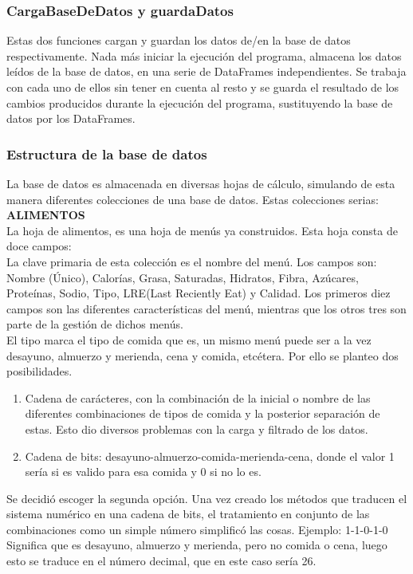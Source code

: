 \subsubsection{CargaBaseDeDatos y guardaDatos}
Estas dos funciones cargan y guardan los datos de/en la base de datos respectivamente. Nada más iniciar la ejecución del programa, almacena los datos leídos de la base de datos, en una serie de DataFrames independientes. Se trabaja con cada uno de ellos sin tener en cuenta al resto y se guarda el resultado de los cambios producidos durante la ejecución del programa, sustituyendo la base de datos por los DataFrames. \\

\subsubsection{Estructura de la base de datos}
La base de datos es almacenada en diversas hojas de cálculo, simulando de esta manera diferentes colecciones de una base de datos. Estas colecciones serias:\\
\textbf{\textsc{ALIMENTOS}}\\
La hoja de alimentos, es una hoja de menús ya construidos. Esta hoja consta de doce campos:\\
La clave primaria de esta colección es el nombre del menú. Los campos son:
Nombre (Único), Calorías, Grasa, Saturadas, Hidratos, Fibra, Azúcares, Proteínas, Sodio, Tipo, LRE(Last Reciently Eat) y Calidad.
Los primeros diez campos son las diferentes características del menú, mientras que los otros tres son parte de la gestión de dichos menús.\\
El tipo marca el tipo de comida que es, un mismo menú puede ser a la vez desayuno, almuerzo y merienda, cena y comida, etcétera. Por ello se planteo dos posibilidades.
\begin{enumerate}
\item Cadena de carácteres, con la combinación de la inicial o nombre de las diferentes combinaciones de tipos de comida y la posterior separación de estas. Esto dio diversos problemas con la carga y filtrado de los datos.
\item Cadena de bits: desayuno-almuerzo-comida-merienda-cena, donde el valor 1 sería si es valido para esa comida y 0 si no lo es.
\end{enumerate} 
Se decidió escoger la segunda opción. Una vez creado los métodos que traducen el sistema numérico en una cadena de bits, el tratamiento en conjunto de las combinaciones como un simple número simplificó las cosas. Ejemplo:
1-1-0-1-0 \\
Significa que es desayuno, almuerzo y merienda, pero no comida o cena, luego esto se traduce en el número decimal, que en este caso sería 26.\\

